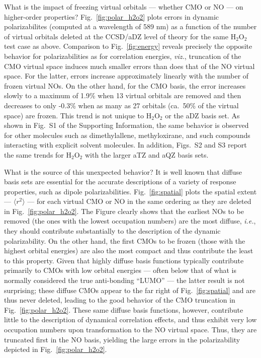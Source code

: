 What is the impact of freezing virtual orbitals --- whether CMO or NO --- on
higher-order properties?  Fig.\ \ref{fig:polar_h2o2} plots errors in dynamic
polarizabilites (computed at a wavelength of 589 nm) as a function of the
number of virtual orbitals deleted at the CCSD/aDZ level of theory for the
same H$_2$O$_2$ test case as above.  Comparison to Fig.\ \ref{fig:energy}
reveals precisely the opposite behavior for polarizabilities as for
correlation energies, {\em viz.}, truncation of the CMO virtual space induces
much smaller errors than does that of the NO virtual space.  For the latter,
errors increase approximately linearly with the number of frozen virtual NOs.
On the other hand, for the CMO basis, the error increases slowly to a maximum
of 1.9\% when 13 virtual orbitals are removed and then decreases to only
-0.3\% when as many as 27 orbitals (ca.\ 50\% of the virtual space) are
frozen.  This trend is not unique to H$_2$O$_2$ or the aDZ basis set. As shown
in Fig.~S1 of the Supporting Information, the same behavior is observed for
other molecules such as dimethylallene, methyloxirane, and such compounds
interacting with explicit solvent molecules.  In addition, Figs.~S2 and S3
report the same trends for H$_2$O$_2$ with the larger aTZ and aQZ basis sets.


What is the source of this unexpected behavior?  It is well known that diffuse
basis sets are essential for the accurate descriptions of a variety of
response properties, such as dipole polarizabilities.\cite{Woon94}  Fig.~\ref{fig:spatial}
plots the spatial extent --- $\langle r^2 \rangle$ --- for each virtual CMO or
NO in the same ordering as they are deleted in Fig.~\ref{fig:polar_h2o2}.  The
Figure clearly shows that the earliest NOs to be removed (the ones with the
lowest occupation numbers) are the most diffuse, {\em i.e.}, they should
contribute substantially to the description of the dynamic polarizability.  On
the other hand, the first CMOs to be frozen (those with the highest orbital
energies) are also the most compact and thus contribute the least to this
property.  Given that highly diffuse basis functions typically contribute
primarily to CMOs with low orbital energies --- often below that of what is
normally considered the true anti-bonding ``LUMO'' --- the latter result is
not surprising; these diffuse CMOs appear to the far right of
Fig.~\ref{fig:spatial} and are thus never deleted, leading to the good
behavior of the CMO truncation in Fig.~\ref{fig:polar_h2o2}.  These same
diffuse basis functions, however, contribute little to the description of
dynamical correlation effects, and thus exhibit very low occupation numbers
upon transformation to the NO virtual space.  Thus, they are truncated first
in the NO basis, yielding the large errors in the polarizability depicted in
Fig.~\ref{fig:polar_h2o2}.

